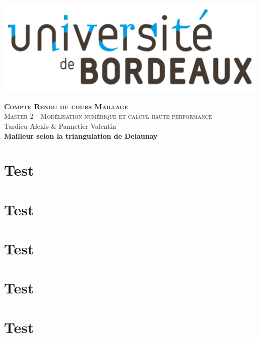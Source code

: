 \documentclass[9pt,a4paper]{article}
\def\custratio{0.2}
\begin{document}
\thispagestyle{empty}
\pagecolor{MyBlue!10!white}
\color{black}

\begin{mdframed}[style=MyFrame,nobreak=true,align=center]
\begin{minipage}{\custratio\textwidth}
    \includegraphics[width=\linewidth]{ublogo.png}\\
\end{minipage}
\hspace{0.02\textwidth}
\begin{minipage}{\textwidth - \custratio\textwidth}
        \textbf{\textsc{\Large Compte Rendu du cours Maillage}}\\
        \textsc{\large Master 2 - Modélisation numérique et calcul haute performance}\\
        {\normalsize Tardieu Alexis \& Pannetier Valentin}\vspace{5mm}\\
        \textbf{\large Mailleur selon la triangulation de Delaunay}\vspace{2mm}
\end{minipage}
\end{mdframed}


\begin{multicols}{2}
\section{Test}
\lipsum[1]
\section{Test}
\lipsum[1]
\section{Test}
\lipsum[1]
\section{Test}
\lipsum[1]
\section{Test}
\lipsum[1]


% 

\end{multicols}
\end{document}
